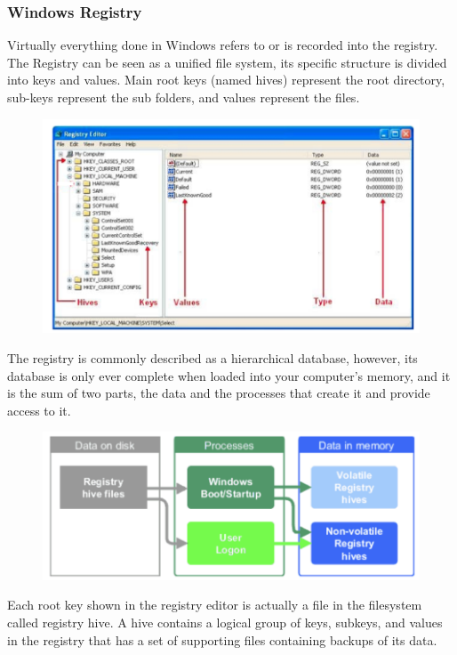 \documentclass[10pt,a4paper]{report}
\begin{document}
\subsubsection{Windows Registry}
Virtually everything done in Windows refers to or is recorded into the registry. The Registry can be seen as a unified file system, its specific structure is divided into keys and values. Main root keys (named hives) represent the root directory, sub-keys represent the sub folders, and values represent the files.
\begin{figure}[H]
\centering
\includegraphics[scale=0.4]{15.png}
\end{figure}
The registry is commonly described as a hierarchical database, however, its database is only ever complete when loaded into your computer's memory, and it is the sum  of two parts, the data and the processes that create it and provide access to it.
\begin{figure}[H]
\centering
\includegraphics[scale=0.3]{16.png}
\end{figure}
Each root key shown in the registry editor is actually a file in the filesystem called registry hive. A hive contains a logical group of keys, subkeys, and values in the registry that has a set of supporting files containing backups of its data.
\end{document}
